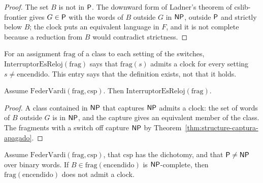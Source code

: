 \begin{proof}
  \leanok
  The set $B$ is not in $\mathsf{P}$. The downward form of Ladner's theorem of cslib-frontier gives $G \in
  \mathsf{P}$ with the words of $B$ outside $G$ in $\mathsf{NP}$, outside $\mathsf{P}$ and strictly below $B$; the clock
  puts an equivalent language in $F$, and it is not complete because a reduction from $B$ would
  contradict strictness.
\end{proof}

\begin{definition}
  \label{def:structure-interruptor-reloj}
  \leanok
  For an assignment $\mathrm{frag}$ of a class to each setting of the switches,
  $\mathrm{InterruptorEsReloj}(\mathrm{frag})$ says that $\mathrm{frag}(s)$ admits a clock for every
  setting $s \neq \mathrm{encendido}$. This entry says that the definition exists, not that it holds.
  \own{}
\end{definition}

\begin{theorem}
  \label{thm:structure-reloj-de-fv}
  \leanok
  Assume $\mathrm{FederVardi}(\mathrm{frag}, \mathrm{csp})$. Then $\mathrm{InterruptorEsReloj}(\mathrm{frag})$.
  \own{}
\end{theorem}

\begin{proof}
  \leanok
  A class contained in $\mathsf{NP}$ that captures $\mathsf{NP}$ admits a clock: the set of words of $B$ outside $G$ is
  in $\mathsf{NP}$, and the capture gives an equivalent member of the class. The fragments with a switch off
  capture $\mathsf{NP}$ by Theorem~\ref{thm:structure-captura-apagado}.
\end{proof}

\begin{theorem}
  \label{thm:structure-encendido-sin-reloj}
  \leanok
  Assume $\mathrm{FederVardi}(\mathrm{frag}, \mathrm{csp})$, that $\mathrm{csp}$ has the dichotomy, and that
  $\mathsf{P} \neq \mathsf{NP}$ over binary words. If $B \in \mathrm{frag}(\mathrm{encendido})$ is $\mathsf{NP}$-complete, then
  $\mathrm{frag}(\mathrm{encendido})$ does not admit a clock.
  \own{}
\end{theorem}

